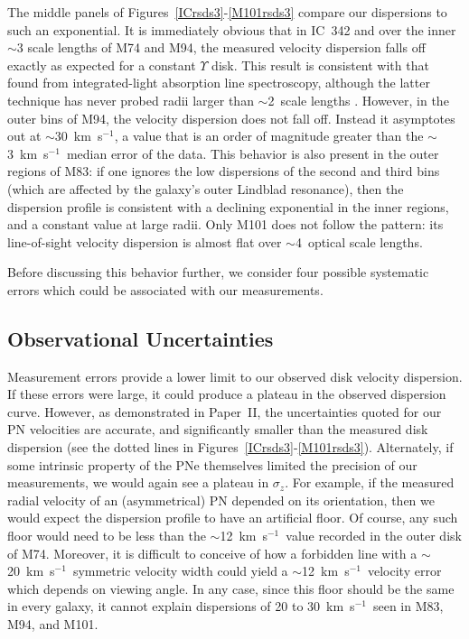 \documentclass[12pt,preprint]{emulateapj}
\newcommand{\eg}{{e.g.,}}
\newcommand{\kms}{km~s$^{-1}$}
\begin{document}
\noindent
The middle panels of Figures~\ref{ICrsds3}-\ref{M101rsds3} compare our dispersions to such an exponential.  It is immediately obvious that in IC~342 and over the inner $\sim$3 scale lengths of M74 and M94, the measured velocity dispersion falls off exactly as expected for a constant $\Upsilon$ disk.  This result is consistent with that found from integrated-light absorption line spectroscopy, although the latter technique has never probed radii larger than $\sim$2~scale lengths \citep[\eg][]{b93}.  However, in the outer bins of M94, the velocity dispersion does not fall off.  Instead it asymptotes out at $\sim$30~\kms, a value that is an order of magnitude greater than the $\sim$3~\kms\ median error of the data.   This behavior is also present in the outer regions of M83:  if one ignores the low dispersions of the second and third bins (which are affected by the galaxy's outer Lindblad resonance), then the dispersion profile is consistent with a declining exponential in the inner regions, and a constant value at large radii.  Only M101 does not follow the pattern:  its line-of-sight velocity dispersion is almost flat over $\sim$4~optical scale lengths.  

Before discussing this behavior further, we consider four possible systematic errors which could be associated with our measurements.

\clearpage

\subsection{Observational Uncertainties}
Measurement errors provide a lower limit to our observed disk velocity dispersion.  If these errors were large, it could produce a plateau in the observed dispersion curve.  However, as demonstrated in Paper~II, the uncertainties quoted for our PN velocities are accurate, and significantly smaller than the measured disk dispersion (see the dotted lines in Figures~\ref{ICrsds3}-\ref{M101rsds3}).  Alternately, if some intrinsic property of the PNe themselves limited the precision of our measurements, we would again see a plateau in $\sigma_z$.  For example, if the measured radial velocity of an (asymmetrical) PN depended on its orientation, then we would expect the dispersion profile to have an artificial floor.  Of course, any such floor would need to be less than the $\sim$12~\kms\ value recorded in the outer disk of M74.  Moreover, it is difficult to conceive of how a forbidden line with a $\sim$20~\kms\ symmetric velocity width could yield a $\sim$12~\kms\ velocity error which depends on viewing angle.  In any case, since this floor should be the same in every galaxy, it cannot explain dispersions of 20 to 30~\kms\ seen in M83, M94, and M101.
\end{document}
